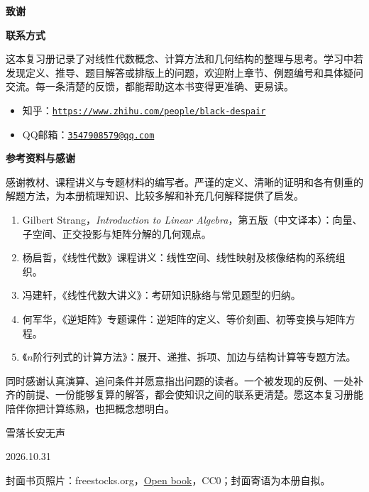 \clearpage\thispagestyle{plain}
\vspace*{8mm}
\begin{center}{\bfseries\color{FrontBlue}致\quad 谢}\end{center}
\vspace{10mm}
{\large\bfseries\color{FrontBlue}联系方式}\par\smallskip
这本复习册记录了对线性代数概念、计算方法和几何结构的整理与思考。学习中若发现定义、推导、题目解答或排版上的问题，欢迎附上章节、例题编号和具体疑问交流。每一条清楚的反馈，都能帮助这本书变得更准确、更易读。
\begin{itemize}[leftmargin=1.7em,itemsep=5pt]
\item 知乎：\href{https://www.zhihu.com/people/black-despair}{\textcolor{FrontBlue}{\nolinkurl{https://www.zhihu.com/people/black-despair}}}
\item QQ邮箱：\href{mailto:3547908579@qq.com}{\textcolor{FrontBlue}{\nolinkurl{3547908579@qq.com}}}
\end{itemize}
\vspace{8mm}
{\large\bfseries\color{FrontBlue}参考资料与感谢}\par\smallskip
感谢教材、课程讲义与专题材料的编写者。严谨的定义、清晰的证明和各有侧重的解题方法，为本册梳理知识、比较多解和补充几何解释提供了启发。
\begin{enumerate}[leftmargin=1.8em,itemsep=6pt]
\item Gilbert Strang，\textit{Introduction to Linear Algebra}，第五版（中文译本）：向量、子空间、正交投影与矩阵分解的几何观点。
\item 杨启哲，《线性代数》课程讲义：线性空间、线性映射及核像结构的系统组织。
\item 冯建轩，《线性代数大讲义》：考研知识脉络与常见题型的归纳。
\item 何军华，《逆矩阵》专题课件：逆矩阵的定义、等价刻画、初等变换与矩阵方程。
\item 《\(n\)阶行列式的计算方法》：展开、递推、拆项、加边与结构计算等专题方法。
\end{enumerate}
同时感谢认真演算、追问条件并愿意指出问题的读者。一个被发现的反例、一处补齐的前提、一份能够复算的解答，都会使知识之间的联系更清楚。愿这本复习册能陪伴你把计算练熟，也把概念想明白。
\vspace{7mm}
\begin{flushright}雪落长安无声\par 2026.10.31\end{flushright}
\vfill
{\footnotesize\color{black!55}封面书页照片：freestocks.org，\href{https://commons.wikimedia.org/wiki/File:Open_book_(26421751605).jpg}{\textcolor{black!55}{Open book}}，CC0；封面寄语为本册自拟。}
